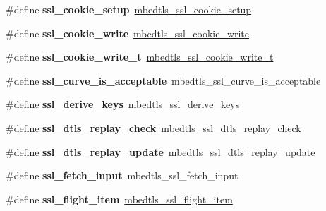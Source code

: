 \begin{DoxyCompactItemize}
\item 
\mbox{\label{compat-1_83_8h_a0c79bee4e6ca637cc5f9d1708e0d9311}} 
\#define {\bfseries ssl\+\_\+cookie\+\_\+setup}~\mbox{\hyperlink{ssl__cookie_8h_ac81843a6bd31b31765639b65329d6b69}{mbedtls\+\_\+ssl\+\_\+cookie\+\_\+setup}}
\item 
\mbox{\label{compat-1_83_8h_a31b716bfeb5ca26773c5a5e6a0818a2a}} 
\#define {\bfseries ssl\+\_\+cookie\+\_\+write}~\mbox{\hyperlink{ssl__cookie_8h_a132e60f12cd3465264d283042cabe6d2}{mbedtls\+\_\+ssl\+\_\+cookie\+\_\+write}}
\item 
\mbox{\label{compat-1_83_8h_af0340810396607f7b5ba9396565c1167}} 
\#define {\bfseries ssl\+\_\+cookie\+\_\+write\+\_\+t}~\mbox{\hyperlink{ssl_8h_a536f8b89936f26732150b00639a47ff0}{mbedtls\+\_\+ssl\+\_\+cookie\+\_\+write\+\_\+t}}
\item 
\mbox{\label{compat-1_83_8h_a665c00313bd3533315ce2cb80be2bf53}} 
\#define {\bfseries ssl\+\_\+curve\+\_\+is\+\_\+acceptable}~mbedtls\+\_\+ssl\+\_\+curve\+\_\+is\+\_\+acceptable
\item 
\mbox{\label{compat-1_83_8h_a8867f0ae1ed64021b7158709e1dc78d6}} 
\#define {\bfseries ssl\+\_\+derive\+\_\+keys}~mbedtls\+\_\+ssl\+\_\+derive\+\_\+keys
\item 
\mbox{\label{compat-1_83_8h_a53173df95992a59e166d798dc3d6a474}} 
\#define {\bfseries ssl\+\_\+dtls\+\_\+replay\+\_\+check}~mbedtls\+\_\+ssl\+\_\+dtls\+\_\+replay\+\_\+check
\item 
\mbox{\label{compat-1_83_8h_a12956774330a1d23bf6f9d2ce7a9e0cc}} 
\#define {\bfseries ssl\+\_\+dtls\+\_\+replay\+\_\+update}~mbedtls\+\_\+ssl\+\_\+dtls\+\_\+replay\+\_\+update
\item 
\mbox{\label{compat-1_83_8h_a971f1446b8c55c770eeb8cedb467cf11}} 
\#define {\bfseries ssl\+\_\+fetch\+\_\+input}~mbedtls\+\_\+ssl\+\_\+fetch\+\_\+input
\item 
\mbox{\label{compat-1_83_8h_adac5866358fe954b866c0e5108636ba3}} 
\#define {\bfseries ssl\+\_\+flight\+\_\+item}~\mbox{\hyperlink{structmbedtls__ssl__flight__item}{mbedtls\+\_\+ssl\+\_\+flight\+\_\+item}}

\end{DoxyCompactItemize}
